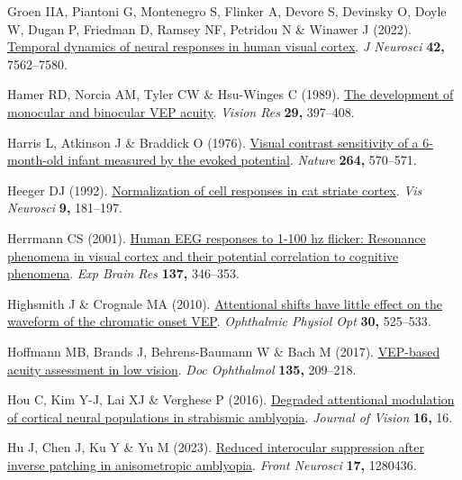 \documentclass[
  letterpaper,
  DIV=11,
  numbers=noendperiod]{scrartcl}
\newlength{\cslhangindent}
\newenvironment{CSLReferences}[2] %
 {\begin{list}{}{%
  \setlength{\itemindent}{0pt}
  \setlength{\leftmargin}{0pt}
  \setlength{\parsep}{0pt}
  \ifodd #1
   \setlength{\leftmargin}{\cslhangindent}
   \setlength{\itemindent}{-1\cslhangindent}
  \fi
  \setlength{\itemsep}{#2\baselineskip}}}
 {\end{list}}
\begin{document}
\begin{CSLReferences}{1}{1}
Groen IIA, Piantoni G, Montenegro S, Flinker A, Devore S, Devinsky O,
Doyle W, Dugan P, Friedman D, Ramsey NF, Petridou N \& Winawer J (2022).
\href{https://doi.org/10.1523/JNEUROSCI.1812-21.2022}{Temporal dynamics
of neural responses in human visual cortex}. \emph{J Neurosci}
\textbf{42,} 7562--7580.

Hamer RD, Norcia AM, Tyler CW \& Hsu-Winges C (1989).
\href{https://doi.org/10.1016/0042-6989(89)90004-7}{The development of
monocular and binocular VEP acuity}. \emph{Vision Res} \textbf{29,}
397--408.

Harris L, Atkinson J \& Braddick O (1976).
\href{https://doi.org/10.1038/264570a0}{Visual contrast sensitivity of a
6-month-old infant measured by the evoked potential}. \emph{Nature}
\textbf{264,} 570--571.

Heeger DJ (1992).
\href{https://doi.org/10.1017/s0952523800009640}{Normalization of cell
responses in cat striate cortex}. \emph{Vis Neurosci} \textbf{9,}
181--197.

Herrmann CS (2001). \href{https://doi.org/10.1007/s002210100682}{Human
EEG responses to 1-100 hz flicker: Resonance phenomena in visual cortex
and their potential correlation to cognitive phenomena}. \emph{Exp Brain
Res} \textbf{137,} 346--353.

Highsmith J \& Crognale MA (2010).
\href{https://doi.org/10.1111/j.1475-1313.2010.00747.x}{Attentional
shifts have little effect on the waveform of the chromatic onset VEP}.
\emph{Ophthalmic Physiol Opt} \textbf{30,} 525--533.

Hoffmann MB, Brands J, Behrens-Baumann W \& Bach M (2017).
\href{https://doi.org/10.1007/s10633-017-9613-y}{VEP-based acuity
assessment in low vision}. \emph{Doc Ophthalmol} \textbf{135,} 209--218.

Hou C, Kim Y-J, Lai XJ \& Verghese P (2016).
\href{https://doi.org/10.1167/16.3.16}{Degraded attentional modulation
of cortical neural populations in strabismic amblyopia}. \emph{Journal
of Vision} \textbf{16,} 16.

Hu J, Chen J, Ku Y \& Yu M (2023).
\href{https://doi.org/10.3389/fnins.2023.1280436}{Reduced interocular
suppression after inverse patching in anisometropic amblyopia}.
\emph{Front Neurosci} \textbf{17,} 1280436.


\end{CSLReferences}
\end{document}

